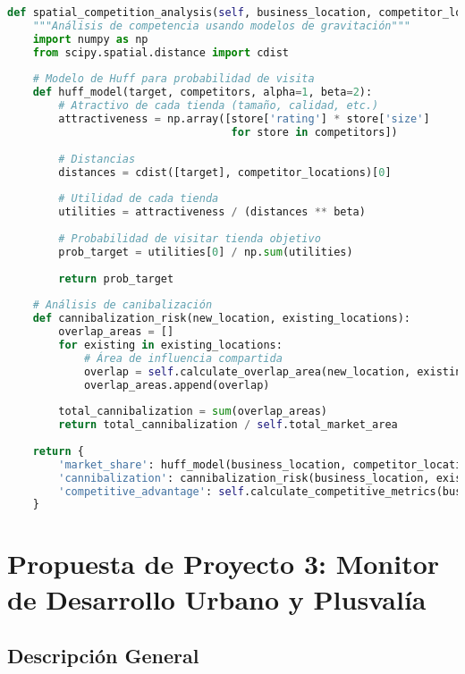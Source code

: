 \documentclass[12pt,a4paper]{article}
\begin{document}
\begin{lstlisting}[language=Python, caption=Análisis avanzado de competencia]
def spatial_competition_analysis(self, business_location, competitor_locations):
    """Análisis de competencia usando modelos de gravitación"""
    import numpy as np
    from scipy.spatial.distance import cdist
    
    # Modelo de Huff para probabilidad de visita
    def huff_model(target, competitors, alpha=1, beta=2):
        # Atractivo de cada tienda (tamaño, calidad, etc.)
        attractiveness = np.array([store['rating'] * store['size'] 
                                   for store in competitors])
        
        # Distancias
        distances = cdist([target], competitor_locations)[0]
        
        # Utilidad de cada tienda
        utilities = attractiveness / (distances ** beta)
        
        # Probabilidad de visitar tienda objetivo
        prob_target = utilities[0] / np.sum(utilities)
        
        return prob_target
    
    # Análisis de canibalización
    def cannibalization_risk(new_location, existing_locations):
        overlap_areas = []
        for existing in existing_locations:
            # Área de influencia compartida
            overlap = self.calculate_overlap_area(new_location, existing)
            overlap_areas.append(overlap)
        
        total_cannibalization = sum(overlap_areas)
        return total_cannibalization / self.total_market_area
    
    return {
        'market_share': huff_model(business_location, competitor_locations),
        'cannibalization': cannibalization_risk(business_location, existing_stores),
        'competitive_advantage': self.calculate_competitive_metrics(business_location)
    }
\end{lstlisting}

\section{Propuesta de Proyecto 3: Monitor de Desarrollo Urbano y Plusvalía}

\subsection{Descripción General}
\end{document}
